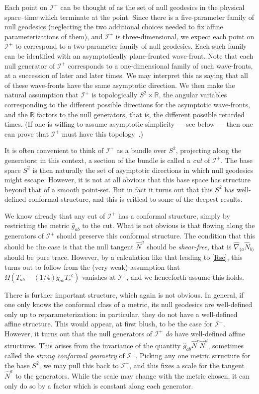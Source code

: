 \documentclass[
%
draft    %
,numberedheadings 
,bibliocites
  ]
  {aipproc}
\newcommand{\scrif}{{{\mathscr I}^{+}}}
\newcommand{\R}{{\mathbb R}}
\begin{document}
Each point on $\scrif$ can  be thought of as the set of null geodesics in the physical space--time which terminate at the point.  Since there is a five-parameter family of null geodesics (neglecting the two additional choices needed to fix affine parameterizations of them), and $\scrif$ is three-dimensional, we expect each point on $\scrif$ to correspond to a two-parameter family of null geodesics.  
Each such family can be identified with an asymptotically plane-fronted wave-front.
Note that each null generator of $\scrif$ corresponds to a one-dimensional family of such wave-fronts, at a succession of later and later times.  We may interpret this as saying that all of these wave-fronts have the same asymptotic direction.
We then make the natural assumption that $\scrif$ is topologically
$S^2\times\R$, the angular variables corresponding to the different possible directions for the asymptotic wave-fronts, and the $\R$ factors to the null generators, that is, the different possible retarded times.
 (If one is willing to assume asymptotic simplicity --- see below --- then one can prove that $\scrif$ must have this topology~\citep{Penrose:1965,Geroch:1971}.)  

It is often convenient to think of $\scrif$ as a bundle over $S^2$, projecting along the generators; in this context, a section of the bundle is called a {\em cut} of $\scrif$.  The base space $S^2$ is then naturally the set of asymptotic directions in which null geodesics might escape.  However, it is not at all obvious that this base space has structure beyond that of a smooth point-set.    But in fact it turns out that this $S^2$ has well-defined conformal structure, and this is critical to some of the deepest results.

We know already that any cut of $\scrif$ has a conformal structure, simply by restricting the metric ${\hat g}_{ab}$ to the cut.  What is not obvious is that flowing along the generators of $\scrif$ should preserve this conformal structure.  The condition that this should be the case is that the null tangent ${\hat N}^a$ should be {\em shear-free}, that is ${\hat\nabla}_{(a}{\hat N}_{b)}$ should be pure trace.  However, by a calculation like that leading to \eqref{Rsc}, this turns out to follow from the (very weak) assumption  that $\Omega (T_{ab}-(1/4)g_{ab}T_c{}^c)$ vanishes at $\scrif$, and we henceforth assume this holds.

There is further important structure, which again is not obvious.  In general, if one only knows the conformal class of a metric, its null geodesics are well-defined only up to reparameterization:  in particular, they do not have a well-defined affine structure.  This would appear, at first blush, to be the case for $\scrif$.  However, it turns out that the null generators of $\scrif$ {\em do} have well-defined affine structures.  This arises from the invariance of the quantity ${\hat g}_{ab}{\hat N}^c{\hat N}^d$, sometimes called the {\em strong conformal geometry} of $\scrif$.  Picking any one metric structure for the base $S^2$, we may pull this back to $\scrif$, and this fixes a scale for the tangent ${\hat N}^a$ to the generators.  While the scale may change with the metric chosen, it can only do so by a factor which is constant along each generator. 
\end{document}

